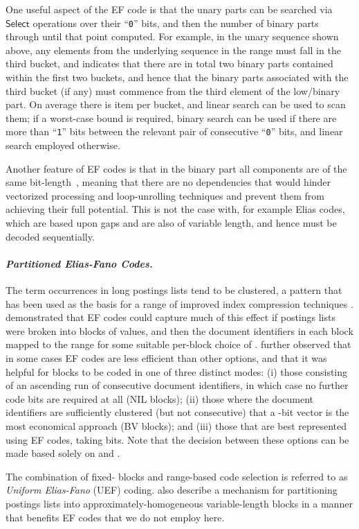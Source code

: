 \documentclass{llncs}
\newcommand{\myparagraph}[1]{\paragraph*{\normalsize\it#1.}}
\newcommand{\Selectop}[0]{\ensuremath{\mathsf{Select}}}
\begin{document}
One useful aspect of the EF code is that the unary parts can be
searched via {\Selectop} operations over their ``{\tt{0}}'' bits, and
then the number of binary parts through until that point computed.
For example, in the unary sequence shown above, any elements from the
underlying sequence in the range  must fall in the third
bucket, and  indicates that there are in
total two binary parts contained within the first two buckets, and
hence that the binary parts associated with the third bucket (if any)
must commence from the third element of the low/binary part.
On average there is  item per bucket, and linear search can
be used to scan them; if a worst-case bound is required, binary
search can be used if there are more than  ``{\tt{1}}''
bits between the relevant pair of consecutive ``{\tt{0}}'' bits, and
linear search employed otherwise.

Another feature of EF codes is that in the binary part all components
are of the same bit-length~, meaning that there are no
dependencies that would hinder vectorized processing and
loop-unrolling techniques and prevent them from achieving their full
potential.
This is not the case with, for example Elias  codes, which
are based upon gaps and are also of variable length, and hence must
be decoded sequentially.

\myparagraph{Partitioned Elias-Fano Codes}


The term occurrences in long postings lists tend to be clustered, a
pattern that has been used as the basis for a range of improved index
compression techniques {\citep{mt02caca}}.
{\citet{ov14sigir}} demonstrated that EF codes could capture much of
this effect if postings lists were broken into blocks of  values,
and then the document identifiers in each block mapped to the range
 for some suitable per-block choice of .
{\citeauthor{ov14sigir}} further observed that in some cases EF codes
are less efficient than other options, and that it was helpful for
blocks to be coded in one of three distinct modes: (i) those
consisting of an ascending run of  consecutive document
identifiers, in which case no further code bits are required at all
(NIL blocks); (ii) those where the document identifiers are
sufficiently clustered (but not consecutive) that a -bit vector
is the most economical approach (BV blocks); and (iii) those that are
best represented using EF codes, taking 
bits.
Note that the decision between these options can be made based solely
on  and .

The combination of fixed- blocks and
range-based code selection is referred to as {\emph{Uniform
Elias-Fano}} (UEF) coding.
{\citeauthor{ov14sigir}} also describe a mechanism for partitioning
postings lists into approximately-homogeneous variable-length blocks
in a manner that benefits EF codes that we do not employ here.
\end{document}
